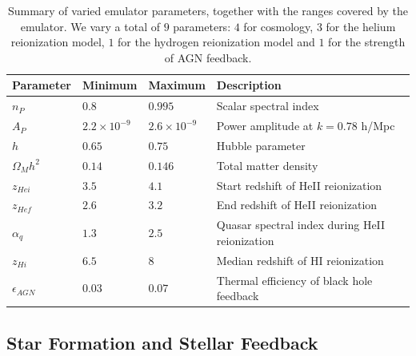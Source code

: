 \documentclass[a4paper,11pt]{article}
\begin{document}
\begin{table}
\begin{centering}
  \begin{tabular}{llll}
  \hline
  Parameter & Minimum & Maximum & Description \\
    \hline
    $n_P$  &  $0.8$  & $0.995$ & Scalar spectral index \\
    $A_P$  &  $2.2 \times 10^{-9}$  & $2.6 \times 10^{-9}$ & Power amplitude at $k = 0.78$ h/Mpc \\
    $h$    & $0.65$  & $0.75$ & Hubble parameter \\
    $\Omega_M h^2$ & $0.14$ & $0.146$ & Total matter density \\
    $z_{Hei}$      & $3.5$  & $4.1$  & Start redshift of HeII reionization \\
    $z_{Hef}$      & $2.6$  & $3.2$  & End redshift of HeII reionization \\
    $\alpha_q$     & $1.3$  & $2.5$ & Quasar spectral index during HeII reionization  \\
    $z_{Hi}$        & $6.5$ & $8$   & Median redshift of HI reionization \\
    $\epsilon_{AGN}$ & $0.03$ & $0.07$ & Thermal efficiency of black hole feedback \\
    \hline
  \end{tabular}
  \caption{Summary of varied emulator parameters, together with the ranges covered by the emulator. We vary a total of $9$ parameters: $4$ for cosmology, $3$ for the helium reionization model, $1$ for the hydrogen reionization model and $1$ for the strength of AGN feedback. }
  \label{tab:emulatorparams}
  \end{centering}
\end{table}

\subsection{Star Formation and Stellar Feedback}
\label{sec:stellar}
\end{document}
